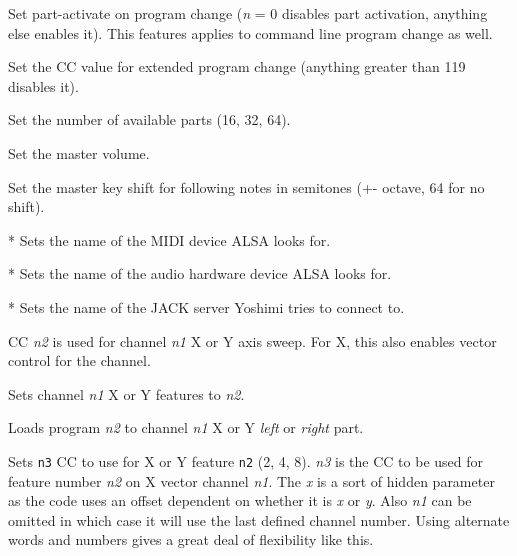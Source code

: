       Set part-activate on program change (\textsl{n} = 0 disables
      part activation, anything else enables it). This features
      applies to command line program change as well.

      Set the CC value for extended program change (anything greater
      than 119 disables it).

      Set the number of available parts (16, 32, 64).

      Set the master volume.

      Set the master key shift for following notes in semitones (+-
      octave, 64 for no shift).

      * Sets the name of the MIDI device ALSA looks for.

      * Sets the name of the audio hardware device ALSA looks for.

      * Sets the name of the JACK server Yoshimi tries to connect to.

      CC \textsl{n2} is used for channel \textsl{n1} X or Y axis sweep.
      For X, this also enables vector control for the channel.

      Sets channel \textsl{n1} X or Y features to \textsl{n2}.

      Loads program \textsl{n2} to channel \textsl{n1} X or Y
      \textsl{left} or \textsl{right} part.

      Sets \texttt{n3} CC to use for X or Y feature \texttt{n2} (2, 4, 8).
      \textsl{n3} is the CC to be used for feature number \textsl{n2} on X
      vector channel \textsl{n1}. The \textsl{x} is a sort of hidden parameter
      as the code uses an offset dependent on whether it is \textsl{x} or
      \textsl{y}. Also \textsl{n1} can be omitted in which case it will use the
      last defined channel number. Using alternate words and numbers gives a
      great deal of flexibility like this.

